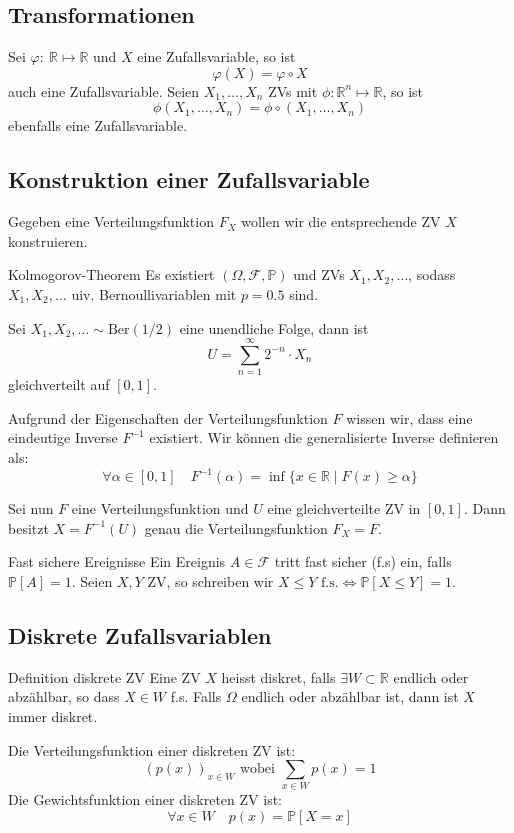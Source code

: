 \documentclass[a4paper,10pt]{article}
\def\R{\mathbb{R}}
\def\P{\mathbb{P}}
\def\F{\mathcal{F}}
\begin{document}
\subsection{Transformationen}
Sei \(\varphi: \ \R \mapsto \R\) und \(X\) eine Zufallsvariable, so ist
\[\varphi(X) = \varphi \circ X\]
auch eine Zufallsvariable. Seien \(X_1, \ldots, X_n\) ZVs mit \(\phi: \R^n \mapsto \R\), so ist
\[\phi(X_1, \ldots, X_n) = \phi \circ (X_1, \ldots, X_n)\]
ebenfalls eine Zufallsvariable.

\subsection{Konstruktion einer Zufallsvariable}
Gegeben eine Verteilungsfunktion \(F_X\) wollen wir die entsprechende ZV \(X\) konstruieren.
\begin{subbox}{Kolmogorov-Theorem}
	Es existiert \((\Omega, \F,\P)\) und ZVs \( X_1, X_2, \ldots\), sodass \(X_1, X_2, \ldots\) uiv. Bernoullivariablen mit \(p = 0.5\) sind.
\end{subbox}

Sei \(X_1, X_2,\ldots \sim \text{Ber}(1/2)\) eine unendliche Folge, dann ist
\[U = \sum_{n = 1}^\infty 2^{-n}\cdot X_n\]
gleichverteilt auf \([0,1]\).

Aufgrund der Eigenschaften der Verteilungsfunktion \(F\) wissen wir, dass eine eindeutige Inverse $F^{-1}$ existiert. Wir können die generalisierte Inverse definieren als: \[\forall \alpha \in [0,1] \quad F^{-1}(\alpha) = \inf \{x \in \R \mid F(x) \geq \alpha\}\]

Sei nun \(F\) eine Verteilungsfunktion und \(U\) eine gleichverteilte ZV in \([0,1]\). Dann besitzt \(X = F^{-1}(U)\) genau die Verteilungsfunktion \(F_X = F\).

\begin{subbox}{Fast sichere Ereignisse}
	Ein Ereignis \(A \in \F\) tritt fast sicher (f.s) ein, falls \(\P[A] = 1\). Seien \(X, Y\) ZV, so schreiben wir \(X \le Y \text{ f.s.} \iff \P[X\le Y] = 1\).
\end{subbox}

\subsection{Diskrete Zufallsvariablen}
\begin{subbox}{Definition diskrete ZV}
	Eine ZV \(X\) heisst diskret, falls \(\exists W \subset \R\) endlich oder abzählbar, so dass \(X \in W\) f.s. Falls \(\Omega\) endlich oder abzählbar ist, dann ist \(X\) immer diskret.
\end{subbox}
\noindent Die Verteilungsfunktion einer diskreten ZV ist:
\[(p(x))_{x \in W} \text{ wobei } \sum_{x\in W} p(x) = 1\]
Die Gewichtsfunktion einer diskreten ZV ist:
\[\forall x \in W \quad p(x) = \P[X=x]\]
\end{document}
